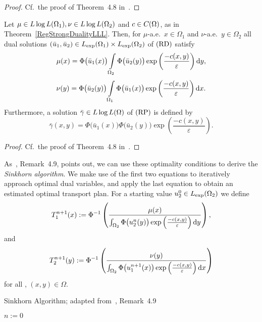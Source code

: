\begin{proof}
	Cf.~the proof of Theorem~4.8 in~\cite{Cla2021}.
\end{proof}

\begin{corollary}\label{RegOptCond}
	Let $\mu \in \LLL[\Omega_1], \nu \in \LLL[\Omega_2]$ and $c \in \CF{\Omega}$, as in Theorem~\ref{RegStrongDualityLLL}. Then, for $\mu$-a.e.\ $x \in \Omega_1$ and $\nu$-a.e.\ $y \in \Omega_2$ all dual solutions $(\bar{u}_1, \bar{u}_2) \in \Lexp[\Omega_1] \times \Lexp[\Omega_2]$ of$\text{\normalfont\ (RD)}$ satisfy
	\[ \mu(x) = \Phi\big( \bar{u}_1(x) \big) \int\limits_{\Omega_2} \Phi\big( \bar{u}_2(y) \big) \exp \left( \frac{- c(x, y)}{\varepsilon} \right)\D[y], \]
	\[ \nu(y) = \Phi\big( \bar{u}_2(y) \big) \int\limits_{\Omega_1} \Phi\big( \bar{u}_1(x) \big) \exp \left( \frac{- c(x, y)}{\varepsilon} \right)\D[x]. \]
	Furthermore, a solution $\bar{\gamma} \in \LLL$ of$\text{\normalfont\ (RP)}$ is defined by
	\[ \bar{\gamma}(x, y) = \Phi\big( \bar{u}_1(x) \big) \Phi\big( \bar{u}_2(y) \big) \exp\left( \frac{- c(x, y)}{\varepsilon} \right). \]
\end{corollary}

\begin{proof}
	Cf.~the proof of Theorem~4.8 in~\cite{Cla2021}.
\end{proof}

As~\cite{Cla2021}, Remark~4.9, points out, we can use these optimality conditions to derive the \textit{Sinkhorn algorithm}. We make use of the first two equations to iteratively approach optimal dual variables, and apply the last equation to obtain an estimated optimal transport plan. For a starting value $u_2^0 \in \Lexp[\Omega_2]$ we define
\[ T_1^{n + 1}(x) := \Phi^{-1} \left( \frac{\mu(x)}{\int_{\Omega_2} \Phi\big( u_2^n(y) \big) \exp\left( \frac{-c(x, y)}{\varepsilon} \right)\D[y]} \right), \]
and
\[ T_2^{n + 1}(y) := \Phi^{-1} \left( \frac{\nu(y)}{\int_{\Omega_2} \Phi\big( u_1^{n + 1}(x) \big) \exp\left( \frac{-c(x, y)}{\varepsilon} \right)\D[x]} \right) \]
for all \NinN, $(x, y) \in \Omega$.
\begin{algorithm}\label{SinkhornAlg}
	\caption{Sinkhorn Algorithm; adapted from~\cite{Cla2021}, Remark~4.9}
	$n := 0$\;
\end{algorithm}

